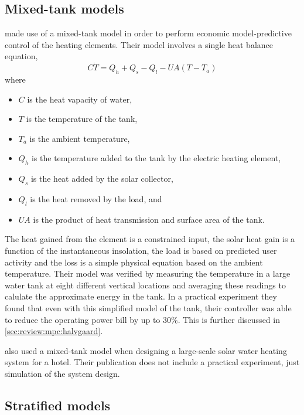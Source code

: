 \subsection{Mixed-tank models}
\label{sec:review:mixed-tank}


\textcite{Halvgaard12} made use of a mixed-tank model in order to perform economic model-predictive control of the heating elements.
Their model involves a single heat balance equation,
$$ C \dot{T} = Q_h + Q_s - Q_l - U A (T - T_a) $$
where
\begin{itemize}
   \item $C$ is the heat vapacity of water,
   \item $T$ is the temperature of the tank,
   \item $T_a$ is the ambient temperature,
   \item $Q_h$ is the temperature added to the tank by the electric heating element,
   \item $Q_s$ is the heat added by the solar collector,
   \item $Q_l$ is the heat removed by the load, and
   \item $U A$ is the product of heat transmission and surface area of the tank.
\end{itemize}
The heat gained from the element is a constrained input, the solar heat gain is a function of the instantaneous insolation, the load is based on predicted user activity and the loss is a simple physical equation based on the ambient temperature.
Their model was verified by measuring the temperature in a large water tank at eight different vertical locations and averaging these readings to calulate the approximate energy in the tank.
In a practical experiment they found that even with this simplified model of the tank, their controller was able to reduce the operating power bill by up to 30\%.
This is further discussed in \autoref{sec:review:mpc:halvgaard}.

\textcite{Cao14} also used a mixed-tank model when designing a large-scale solar water heating system for a hotel.
Their publication does not include a practical experiment, just simulation of the system design.

\subsection{Stratified models}
\label{sec:review:stratified-tank-models}

